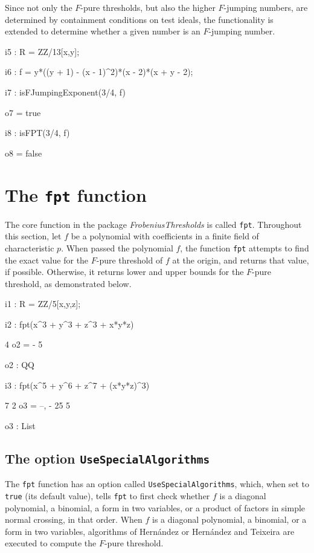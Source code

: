 \documentclass{amsart}
\begin{document}
Since not only the $F$-pure thresholds, but also the higher $F$-jumping numbers, are determined by containment conditions on test ideals, the functionality is extended to determine whether a given number is an $F$-jumping number.

\smallskip
{\small
{}
\begin{MyVerbatim}
i5 : R = ZZ/13[x,y];

i6 : f = y*((y + 1) - (x - 1)^2)*(x - 2)*(x + y - 2);

i7 : isFJumpingExponent(3/4, f)

o7 = true

i8 : isFPT(3/4, f)

o8 = false
\end{MyVerbatim}
}


\section{The {\tt fpt} function}
\label{sec.FPT}

The core function in the package \emph{FrobeniusThresholds} is called \texttt{fpt}.  Throughout this section, let $f$ be a polynomial with coefficients in a finite field of characteristic $p$. When passed the polynomial $f$, the function \texttt{fpt} attempts to find the exact value for the $F$-pure threshold of $f$ at the origin, and returns that value, if possible.  Otherwise, it returns lower and upper bounds for the $F$-pure threshold, as demonstrated below.

\smallskip
{\small
{}
\begin{MyVerbatim}
i1 : R = ZZ/5[x,y,z];

i2 : fpt(x^3 + y^3 + z^3 + x*y*z)

     4
o2 = -
     5

o2 : QQ

i3 : fpt(x^5 + y^6 + z^7 + (x*y*z)^3)

       7  2
o3 = {--, -}
      25  5

o3 : List
\end{MyVerbatim}
}


\subsection{The option \texttt{UseSpecialAlgorithms}}\label{ss: UseSpecialAlgorithms}

The \texttt{fpt} function has an option called \texttt{UseSpecialAlgorithms}, which, when set to \texttt{true} (its default value), tells \texttt{fpt} to first check whether $f$ is a diagonal polynomial, a binomial, a form in two variables, or a product of factors in simple normal crossing, in that order.
When $f$ is a diagonal polynomial, a binomial, or a form in two variables, algorithms of Hern\'andez \cite{HernandezFInvariantsOfDiagonalHyp, HernandezFPureThresholdOfBinomial} or Hern\'andez and Teixeira \cite{HernandezTeixeiraFThresholdFunctions} are executed to compute the $F$-pure threshold.
\end{document}
